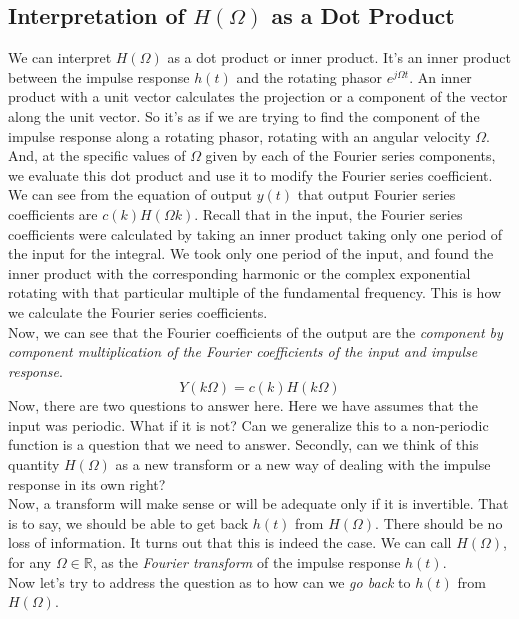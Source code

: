 \subsection{Interpretation of $H(\Omega)$ as a Dot Product}
We can interpret $H(\Omega)$ as a dot product or inner product. It’s an inner product between the impulse response $h(t)$ and the rotating phasor $e^{j\Omega t}$. An inner product with a unit vector calculates the projection or a component of the vector along the unit vector. So it's as if we are trying to find the component of the impulse response along a rotating phasor, rotating with an angular velocity $\Omega$. And, at the specific values of $\Omega$ given by each of the Fourier series components, we evaluate this dot product and use it to modify the Fourier series coefficient.
We can see from the equation of output $y(t)$ that output Fourier series coefficients are $c(k)H(\Omega k)$. Recall that in the input, the Fourier series coefficients were calculated by taking an inner product taking only one period of the input for the integral.
We took only one period of the input, and found the inner product with the corresponding harmonic or the complex exponential rotating with that particular multiple of the fundamental frequency. This is how we calculate the Fourier series coefficients.\\
Now, we can see that the Fourier coefficients of the output are the \emph{component by component multiplication of the Fourier coefficients of the input and impulse response}.
\[
Y(k\Omega)= c(k)H(k\Omega)
\]
Now, there are two questions to answer here. Here we have assumes that the input was periodic. What if it is not? Can we generalize this to a non-periodic function is a question that we need to answer. Secondly, can we think of this quantity $H(\Omega)$ as a new transform or a new way of dealing with the impulse response in its own right?\\
Now, a transform will make sense or will be adequate only if it is invertible. That is to say, we should be able to get back $h(t)$ from $H(\Omega)$. There should be no loss of information. It turns out that this is indeed the case. We can call $H(\Omega)$, for any $\Omega \in \mathbb{R}$, as the \emph{Fourier transform} of the impulse response $h(t)$.\\
Now let's try to address the question as to how can we \emph{go back} to $h(t)$ from $H(\Omega)$.
